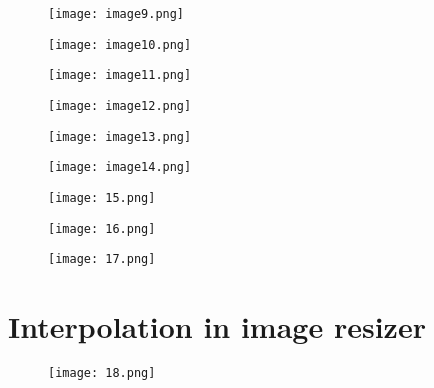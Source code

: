 \documentclass[a4paper,12pt,openany]{article}
\begin{document}
\clearpage
\begin{figure}[H]
    \centering
    \texttt{[image: image9.png]}
    \label{fig:enter-label}
\end{figure}

\begin{figure}[H]
    \centering
    \texttt{[image: image10.png]}
    \label{fig:enter-label}
\end{figure}

\begin{figure}[H]
    \centering
    \texttt{[image: image11.png]}
    \label{fig:enter-label}
\end{figure}

\clearpage
\begin{figure}[H]
    \centering
    \texttt{[image: image12.png]}
    \label{fig:enter-label}
\end{figure}

\begin{figure}[H]
    \centering
    \texttt{[image: image13.png]}
    \label{fig:enter-label}
\end{figure}

\begin{figure}[H]
    \centering
    \texttt{[image: image14.png]}
    \label{fig:enter-label}
\end{figure}

\clearpage
\begin{figure}[H]
    \centering
    \texttt{[image: 15.png]}
    \label{fig:enter-label}
\end{figure}

\begin{figure}[H]
    \centering
    \texttt{[image: 16.png]}
    \label{fig:enter-label}
\end{figure}

\begin{figure}[H]
    \centering
    \texttt{[image: 17.png]}
    \label{fig:enter-label}
\end{figure}

\clearpage
\section{Interpolation in image resizer}
\begin{figure}[H]
    \centering
    \texttt{[image: 18.png]}
    \label{fig:enter-label}
\end{figure}
\end{document}
